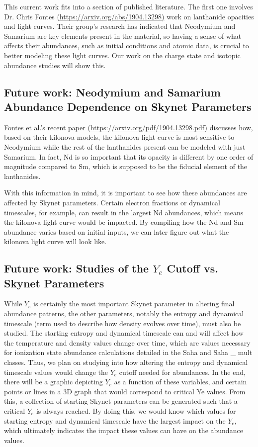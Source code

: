 \documentclass[11pt,a4paper]{article}
\begin{document}
This current work fits into a section of published literature. The first one involves Dr. Chris Fontes \url{(https://arxiv.org/abs/1904.13298)} work on lanthanide opacities and light curves. Their group’s research has indicated that Neodymium and Samarium are key elements present in the material, so having a sense of what affects their abundances, such as initial conditions and atomic data, is crucial to better modeling these light curves. Our work on the charge state and isotopic abundance studies will show this.


\subsection{Future work: Neodymium and Samarium Abundance Dependence on Skynet Parameters}

Fontes et al.'s recent paper \url{(https://arxiv.org/pdf/1904.13298.pdf)} discusses how, based on their kilonova models, the kilonova light curve is most sensitive to Neodymium while the rest of the lanthanides present can be modeled with just Samarium. In fact, Nd is so important that its opacity is different by one order of magnitude compared to Sm, which is supposed to be the fiducial element of the lanthanides. 

With this information in mind, it is important to see how these abundances are affected by Skynet parameters. Certain electron fractions or dynamical timescales, for example, can result in the largest Nd abundances, which means the kilonova light curve would be impacted. By compiling how the Nd and Sm abundance varies based on initial inputs, we can later figure out what the kilonova light curve will look like. 


\subsection{Future work: Studies of the $Y_e$ Cutoff vs. Skynet Parameters}

While $Y_e$ is certainly the most important Skynet parameter in altering final abundance patterns, the other parameters, notably the entropy and dynamical timescale (term used to describe how density evolves over time), must also be studied. The starting entropy and dynamical timescale can and will affect how the temperature and density values change over time, which are values necessary for ionization state abundance calculations detailed in the Saha and Saha \_ mult classes. 
Thus, we plan on studying into how altering the entropy and dynamical timescale values would change the $Y_e$ cutoff needed for abundances. In the end, there will be a graphic depicting $Y_e$ as a function of these variables, and certain points or lines in a 3D graph that would correspond to critical Ye values. From this, a collection of starting Skynet parameters can be generated such that a critical $Y_e$ is always reached. By doing this, we would know which values for starting entropy and dynamical timescale have the largest impact on the $Y_e$, which ultimately indicates the impact these values can have on the abundance values. 
\end{document}
